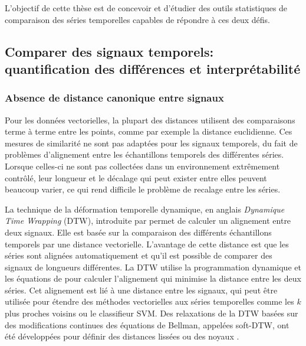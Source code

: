 \documentclass[../thesis.tex]{subfiles}
\begin{document}
	L'objectif de cette thèse est de concevoir et d'étudier des outils statistiques de
	comparaison des séries temporelles capables de répondre à ces deux défis.






\subsection[Comparer des signaux temporels: quantification des différences\\et interprétabilité]{%
			Comparer des signaux temporels: quantification des différences et interprétabilité}
\label{sub:french:ts_stat}


\subsubsection{Absence de distance canonique entre signaux}
\label{subs:french:no_dist}


	Pour les données vectorielles, la plupart des distances utilisent des comparaisons
	terme à terme entre les points, comme par exemple la distance euclidienne. Ces mesures
	de similarité ne sont pas adaptées pour les signaux temporels, du fait de problèmes
	d'alignement entre les échantillons temporels des différentes séries. Lorsque celles-ci ne sont
	pas collectées dans un environnement extrêmement contrôlé, leur longueur et le décalage
	qui peut exister entre elles peuvent beaucoup varier, ce qui rend difficile le problème
	de recalage entre les séries.


	La technique de la déformation temporelle dynamique, en anglais \emph{Dynamique Time Wrapping} (DTW),
	introduite par \citet{Sakoe1971} permet de calculer un alignement entre deux signaux. Elle est
	basée sur la comparaison des différents échantillons temporels par une distance vectorielle.
	L'avantage de cette distance est que les séries sont alignées automatiquement et qu'il est
	possible de comparer des signaux de longueurs différentes. La DTW utilise la programmation
	dynamique et les équations de \citet{Bellman1952} pour calculer l'alignement qui minimise
	la distance entre les deux séries. Cet alignement est lié à une distance entre les signaux,
	qui peut être utilisée pour étendre des méthodes vectorielles aux séries temporelles comme
	les $k$ plus proches voisins ou le classifieur SVM. Des relaxations de la DTW basées sur
	des modifications continues des équations de Bellman, appelées soft-DTW, ont été développées
	pour définir des distances lissées \citep{Bahl1975} ou des noyaux \citep{Saigo2004}.
\end{document}
